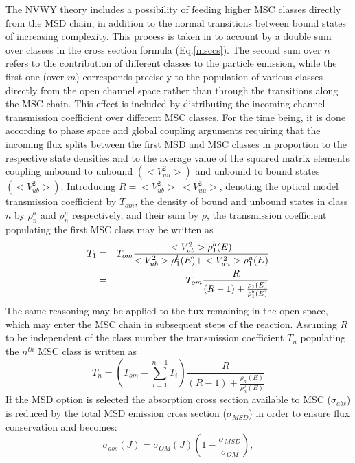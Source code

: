 The NVWY%
 theory includes a possibility of feeding higher MSC classes
directly from the MSD%
 chain, in addition to the normal transitions between bound
states of increasing complexity. This process is taken in to account by a
double sum over classes in the cross section formula (Eq.\ref{msccs}). The
second sum over $n$ refers to the contribution of different classes to the
particle emission, while the first one (over $m$) corresponds precisely to
the population of various classes directly from the open channel space
rather than through the transitions along the MSC chain. This effect is
included 
by distributing the incoming channel transmission coefficient over different
MSC%
 classes. For the time being, it is done according to phase space
and global coupling arguments requiring that the incoming flux splits
between the first MSD%
 and MSC classes in proportion to the respective state densities
and to the average value of the squared matrix elements coupling unbound to
unbound $(<V_{uu}^{2}>)$ and unbound to bound states $(<V_{ub}^{2}>)$.
Introducing $R=<V_{ub}^{2}>\mid<V_{uu}^{2}>$, denoting the optical model
transmission coefficient by $T_{om}$, the density of bound and unbound
states in class $n$ by $\rho_{n}^{b}$ and $\rho_{n}^{u}$ respectively, and
their sum by $\rho$, the transmission coefficient populating the first MSC%
 class may be written as 
\begin{eqnarray}
T_{1}&=&T_{om}%
\frac{<V_{ub}^{2}>\rho_{1}^{b}(E)}{<V_{ub}^{2}>\rho_{1}^{b}(E)+<V_{uu}^{2}>%
\rho_{1}^{u}(E)}  \notag \\
&=&T_{om}\frac{R}{(R-1)+\frac{\rho_{1}(E)}{\rho_{1}^{b}(E)}}  \label{eq9}
\end{eqnarray}
The same reasoning may be applied to the flux remaining in the open space,
which may enter the MSC%
 chain in subsequent steps of the reaction. Assuming $R$ to be
independent of the class number the transmission coefficient $T_{n}$
populating the $n^{th}$ MSC class is written as 
\begin{equation}
T_{n}=\left(T_{om}-\sum_{i=1}^{n-1}T_{i}\right)%
\frac{R}{(R-1)+\frac{\rho_{n}(E)}{\rho_{n}^{b}(E)}}  \label{eq10}
\end{equation}
If the MSD%
 option is selected the absorption cross section available to MSC
($\sigma_{abs}$) is reduced by the total MSD emission cross section ($%
\sigma_{MSD}$) in order to ensure flux conservation and becomes: 
\begin{equation}
\sigma_{abs}(J)=\sigma_{OM}(J)\left(1-%
\frac{\sigma_{MSD}}{\sigma_{OM}}\right),  \label{CNabs}
\end{equation}
